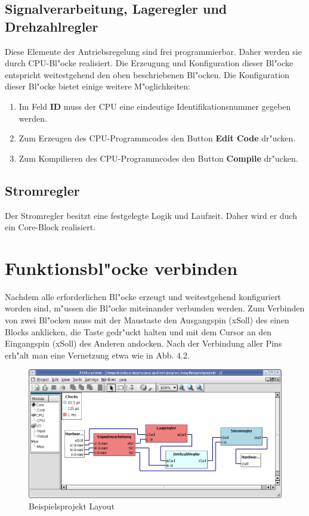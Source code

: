 \subsection{Signalverarbeitung, Lageregler und Drehzahlregler}
Diese Elemente der Antriebsregelung sind frei programmierbar. Daher werden sie durch CPU-Bl"ocke realisiert. Die Erzeugung und Konfiguration dieser Bl"ocke entspricht weitestgehend den oben beschriebenen Bl"ocken. Die Konfiguration dieser Bl"ocke bietet einige weitere M"oglichkeiten:
\begin{enumerate}
	\item Im Feld {\bf ID} muss der CPU eine eindeutige Identifikationsnummer gegeben werden.
	\item Zum Erzeugen des CPU-Programmcodes den Button {\bf Edit Code} dr"ucken.
	\item Zum Kompilieren des CPU-Programmcodes den Button {\bf Compile} dr"ucken.
\end{enumerate}

\subsection{Stromregler}
Der Stromregler besitzt eine festgelegte Logik und Laufzeit. Daher wird er duch ein Core-Block realisiert.


\section{Funktionsbl"ocke verbinden}
Nachdem alle erforderlichen Bl"ocke erzeugt und weitestgehend konfiguriert worden sind, m"ussen die Bl"ocke miteinander verbunden werden. Zum Verbinden von zwei Bl"ocken muss mit der Maustaste den Ausgangspin (xSoll) des einen Blocks anklicken, die Taste gedr"uckt halten und mit dem Cursor an den Eingangspin (xSoll) des Anderen andocken. Nach der Verbindung aller Pins erh"alt man eine Vernetzung etwa wie in Abb. 4.2.
\begin{figure}[htbp]

\begin{center}

\includegraphics[width=15cm]{Bspprojekt1}
\caption{Beispielsprojekt Layout}\label{test}
\end{center}

\end{figure}

